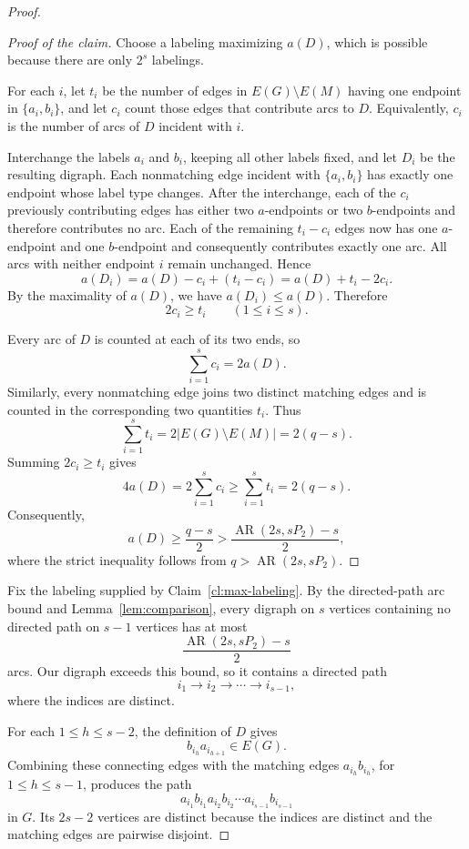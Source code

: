 \documentclass[12pt]{article}
\DeclareMathOperator{\AR}{AR}
\begin{document}
\begin{proof}
	\begin{proof}[Proof of the claim]
		Choose a labeling maximizing $a(D)$, which is possible
		because there are only $2^s$ labelings.
		
		For each $i$, let $t_i$ be the number of edges in
		$E(G)\setminus E(M)$ having one endpoint in
		$\{a_i,b_i\}$, and let $c_i$ count those edges that
		contribute arcs to $D$.
		Equivalently, $c_i$ is the number of arcs of $D$
		incident with $i$.
		
		Interchange the labels $a_i$ and $b_i$, keeping all
		other labels fixed, and let $D_i$ be the resulting
		digraph. Each nonmatching edge incident with
		$\{a_i,b_i\}$ has exactly one endpoint whose label
		type changes. After the interchange, each of the $c_i$ previously
		contributing edges has either two $a$-endpoints or two
		$b$-endpoints and therefore contributes no arc.
		Each of the remaining $t_i-c_i$ edges now has one
		$a$-endpoint and one $b$-endpoint and consequently
		contributes exactly one arc.
		All arcs with neither endpoint $i$ remain unchanged.
		Hence
		\[
		a(D_i)=a(D)-c_i+(t_i-c_i)
		=a(D)+t_i-2c_i.
		\]
		By the maximality of $a(D)$, we have $a(D_i)\le a(D)$.
		Therefore
		\[
		2c_i\ge t_i
		\qquad (1\le i\le s).
		\]
		
		Every arc of $D$ is counted at each of its two ends,
		so 
		\[\sum_{i=1}^s c_i=2a(D).\]
		Similarly, every nonmatching edge joins two distinct
		matching edges and is counted in the corresponding
		two quantities $t_i$. Thus
		\[
		\sum_{i=1}^s t_i
		=2|E(G)\setminus E(M)|
		=2(q-s).
		\]
		Summing $2c_i\ge t_i$ gives
		\[
		4a(D)
		=2\sum_{i=1}^s c_i
		\ge\sum_{i=1}^s t_i
		=2(q-s).
		\]
		Consequently,
		\[
		a(D)\ge\frac{q-s}{2}
		>\frac{\AR(2s,sP_2)-s}{2},
		\]
		where the strict inequality follows from
		$q>\AR(2s,sP_2)$.
	\end{proof}
	
	Fix the labeling supplied by Claim~\ref{cl:max-labeling}.
	By the directed-path arc bound and
	Lemma~\ref{lem:comparison}, every digraph on $s$ vertices
	containing no directed path on $s-1$ vertices has at most
	\[
	\frac{\AR(2s,sP_2)-s}{2}
	\]
	arcs. Our digraph exceeds this bound, so it contains
	a directed path
	\[
	i_1\to i_2\to\cdots\to i_{s-1},
	\]
	where the indices are distinct.
	
	For each $1\le h\le s-2$, the definition of $D$ gives
	\[
	b_{i_h}a_{i_{h+1}}\in E(G).
	\]
	Combining these connecting edges with the matching
	edges $a_{i_h}b_{i_h}$, for $1\le h\le s-1$, produces
	the path
	\[
	a_{i_1}b_{i_1}a_{i_2}b_{i_2}\cdots
	a_{i_{s-1}}b_{i_{s-1}}
	\]
	in $G$. Its $2s-2$ vertices are distinct because
	the indices are distinct and the matching edges
	are pairwise disjoint.
	

\end{proof}
\end{document}
